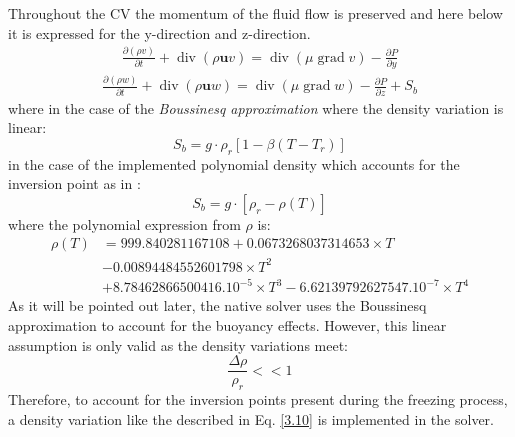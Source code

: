 \setlength{\parindent}{0.5cm} Throughout the CV the momentum of the fluid flow is preserved and here below it is expressed for the y-direction and z-direction.
\begin{equation}
	\begin{aligned}
		\frac{\partial(\rho v)}{\partial t}+\operatorname{div}(\rho \mathbf{u} v)=\operatorname{div}(\mu \operatorname{grad} v)-\frac{\partial P}{\partial y}
	\end{aligned}
	\label{3.6}
\end{equation}
\begin{equation}
	\begin{aligned}
		\frac{\partial(\rho w)}{\partial t}+\operatorname{div}(\rho \mathbf{u} w)=\operatorname{div}(\mu \operatorname{grad} w)-\frac{\partial P}{\partial z}+S_{b}
	\end{aligned}
	\label{3.7}
\end{equation}
where in the case of the \textit{Boussinesq approximation} where the density variation is linear:
\begin{equation}
	S_{b} = g\cdot\rho_{r}[1-\beta(T-T_{r})]
	\label{3.8}
\end{equation}
in the case of the implemented polynomial density which accounts for the inversion point as in \cite{bourdillon_2016}:
\begin{equation}
	S_{b} = g\cdot[\rho_{r}-\rho(T)]
	\label{3.9}
\end{equation}
where the polynomial expression from $\rho$ is:
\begin{equation}
	\begin{aligned}
		\rho(T) &=999.840281167108+0.0673268037314653 \times T \\
		&-0.00894484552601798 \times T^{2} \\
		&+8.78462866500416 .10^{-5} \times T^{3} 
		-6.62139792627547 .10^{-7} \times T^{4}
	\end{aligned}
	\label{3.10}
\end{equation}
As it will be pointed out later, the native solver uses the Boussinesq approximation to account for the buoyancy effects. However, this linear assumption is only valid as the density variations meet:
\begin{equation}
	\frac{\Delta \rho}{\rho_{r}}<<1
	\label{3.11}
\end{equation}
Therefore, to account for the inversion points present during the freezing process, a density variation like the described in Eq. \ref{3.10} is implemented in the solver.

